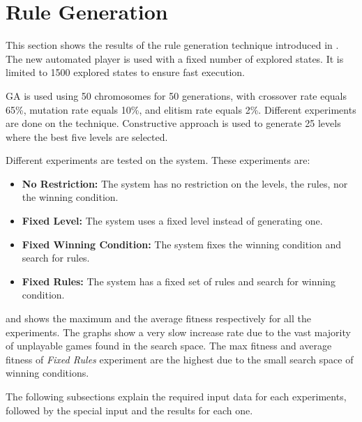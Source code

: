 \section{Rule Generation}
This section shows the results of the rule generation technique introduced in . The new automated player is used with a fixed number of explored states. It is limited to 1500 explored states to ensure fast execution.\\\par

GA is used using 50 chromosomes for 50 generations, with crossover rate equals 65\%, mutation rate equals 10\%, and elitism rate equals 2\%. Different experiments are done on the technique. Constructive approach is used to generate 25 levels where the best five levels are selected.\\\par

Different experiments are tested on the system. These experiments are:
\begin{itemize}
	\item \textbf{No Restriction:} The system has no restriction on the levels, the rules, nor the winning condition.
	\item \textbf{Fixed Level:} The system uses a fixed level instead of generating one.
	\item \textbf{Fixed Winning Condition:} The system fixes the winning condition and search for rules.
	\item \textbf{Fixed Rules:} The system has a fixed set of rules and search for winning condition. 
\end{itemize}

 and  shows the maximum and the average fitness respectively for all the experiments. The graphs show a very slow increase rate due to the vast majority of unplayable games found in the search space. The max fitness and average fitness of \emph{Fixed Rules} experiment are the highest due to the small search space of winning conditions.



The following subsections explain the required input data for each experiments, followed by the special input and the results for each one.


